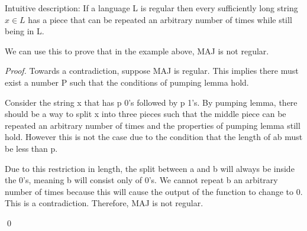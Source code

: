 Intuitive description: If a language L is regular then every sufficiently long string $x \in L$ has a piece that can be repeated an arbitrary number of times while still being in L.

We can use this to prove that in the example above, MAJ is not regular.

\begin{proof}

    Towards a contradiction, suppose MAJ is regular. This implies there must exist a number P such that the conditions of pumping lemma hold.

    Consider the string x that has p 0's followed by p 1's. By pumping lemma, there should be a way to split x into three pieces such that the middle piece can be repeated an arbitrary number of times and the properties of pumping lemma still hold. However this is not the case due to the condition that the length of ab must be less than p. 

    Due to this restriction in length, the split between a and b will always be inside the 0's, meaning b will consist only of 0's. We cannot repeat b an arbitrary number of times because this will cause the output of the function to change to 0. This is a contradiction. Therefore, MAJ is not regular.
    
    \qed
\end{proof}